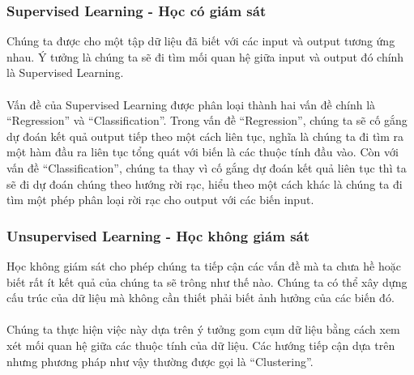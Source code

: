 \subsubsection{Supervised Learning - Học có giám sát}
Chúng ta được cho một tập dữ liệu đã biết với các input và output tương ứng
nhau. Ý tưởng là chúng ta sẽ đi tìm mối quan hệ giữa input và output đó chính là
Supervised Learning.\\\\
Vấn đề của Supervised Learning được phân loại thành hai
vấn đề chính là “Regression” và “Classification”. Trong vấn đề “Regression”,
chúng ta sẽ cố gắng dự đoán kết quả output tiếp theo một cách liên tục, nghĩa là
chúng ta đi tìm ra một hàm đầu ra liên tục tổng quát với biến là các thuộc tính
đầu vào. Còn với vấn đề “Classification”, chúng ta thay vì cố gắng dự đoán kết
quả liên tục thì ta sẽ đi dự đoán chúng theo hướng rời rạc, hiểu theo một cách
khác là chúng ta đi tìm một phép phân loại rời rạc cho output với các biến
input.
\subsubsection{Unsupervised Learning - Học không giám sát}
Học không giám sát cho phép chúng ta tiếp cận các vấn đề mà ta chưa hề hoặc biết
rất ít kết quả của chúng ta sẽ trông như thế nào. Chúng ta có thể xây dựng cấu
trúc của dữ liệu mà không cần thiết phải biết ảnh hưởng của các biến đó.\\\\
Chúng ta thực hiện việc này dựa trên ý tưởng gom cụm dữ liệu bằng cách xem xét
mối quan hệ giữa các thuộc tính của dữ liệu. Các hướng tiếp cận dựa trên nhưng 
phương pháp như vậy thường được gọi là “Clustering”.


